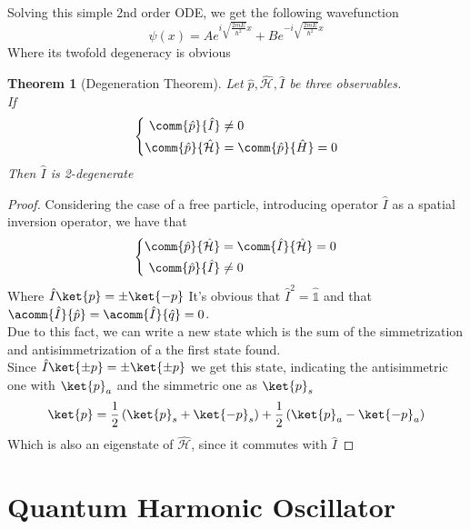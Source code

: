 \documentclass[a4paper, 11pt]{book}
\newcommand{\1}{\opr{\mathds{1}}}
\newcommand{\ham}{\mathcal{H}}
\newcommand{\opr}[1]{\hat{#1}}
\newtheorem{thm}{Theorem}
\theoremstyle{plain}
\begin{document}
	Solving this simple 2nd order ODE, we get the following wavefunction
	\begin{equation}
		\psi(x)=Ae^{i\sqrt{\frac{2mE}{\hbar^2}}x}+Be^{-i\sqrt{\frac{2mE}{\hbar^2}}x}
		\label{eq:freepartwavefunction}
	\end{equation}
	Where its twofold degeneracy is obvious
	\begin{thm}[Degeneration Theorem]
		Let $\opr{p},\opr{\ham},\opr{I}$ be three observables.\\
		If
		\begin{equation}
			\left\{\begin{aligned}
				\comm{\opr{p}}{\opr{I}}&\ne0\\
				\comm{\opr{p}}{\opr{\ham}}&=\comm{\opr{p}}{\opr{H}}=0
			\end{aligned}\right.
			\label{eq:nondeg}
		\end{equation}
		Then $\opr{I}$ is 2-degenerate
	\end{thm}
	\begin{proof}
		Considering the case of a free particle, introducing operator $\opr{I}$ as a spatial inversion operator, we have that
		\begin{equation*}
			\left\{ \begin{aligned}
					\comm{\opr{p}}{\opr{\ham}}&=\comm{\opr{I}}{\opr{\ham}}=0\\
					\comm{\opr{p}}{\opr{I}}&\ne0
			\end{aligned}\right.
		\end{equation*}
		Where $\opr{I}\ket{p}=\pm\ket{-p}$
		It's obvious that $\opr{I}^2=\1$ and that $\acomm{\opr{I}}{\opr{p}}=\acomm{\opr{I}}{\opr{q}}=0$.\\
		Due to this fact, we can write a new state which is the sum of the simmetrization and antisimmetrization of a the first state found.\\
		Since $\opr{I}\ket{\pm p}=\pm\ket{\pm p}$ we get this state, indicating the antisimmetric one with $\ket{p}_a$ and the simmetric one as $\ket{p}_s$
		\begin{equation}
			\ket{p}=\frac{1}{2}\left( \ket{p}_s+\ket{-p}_s \right)+\frac{1}{2}\left( \ket{p}_a-\ket{-p}_a \right)
			\label{eq:state}
		\end{equation}
		Which is also an eigenstate of $\opr{\ham}$, since it commutes with $\opr{I}$
	\end{proof}
	\section{Quantum Harmonic Oscillator}
\end{document}
